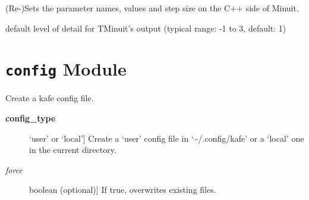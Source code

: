 \documentclass[a4paper,10pt,english]{sphinxmanual}
\begin{document}
\begin{fulllineitems}
\begin{fulllineitems}
\end{fulllineitems}


\begin{fulllineitems}
\label{index:kafe.minuit.Minuit.update_parameter_data}
(Re-)Sets the parameter names, values and step size on the
C++ side of Minuit.

\end{fulllineitems}


\end{fulllineitems}


\begin{fulllineitems}
\label{index:kafe.minuit.P_DETAIL_LEVEL}
default level of detail for TMinuit's output
(typical range: -1 to 3, default: 1)

\end{fulllineitems}



\section{\texttt{config} Module}
\label{index:module-kafe.config}\label{index:config-module}\label{index:module-config}

\begin{fulllineitems}
\label{index:kafe.config.create_config_file}
Create a kafe config file.
\begin{description}
\item[{\textbf{config\_type}}] \leavevmode{[}`user' or `local'{]}
Create a `user' config file in `\textasciitilde{}/.config/kafe' or a
`local' one in the current directory.

\item[{\emph{force}}] \leavevmode{[}boolean (optional){]}
If true, overwrites existing files.

\end{description}

\end{fulllineitems}
\end{document}
